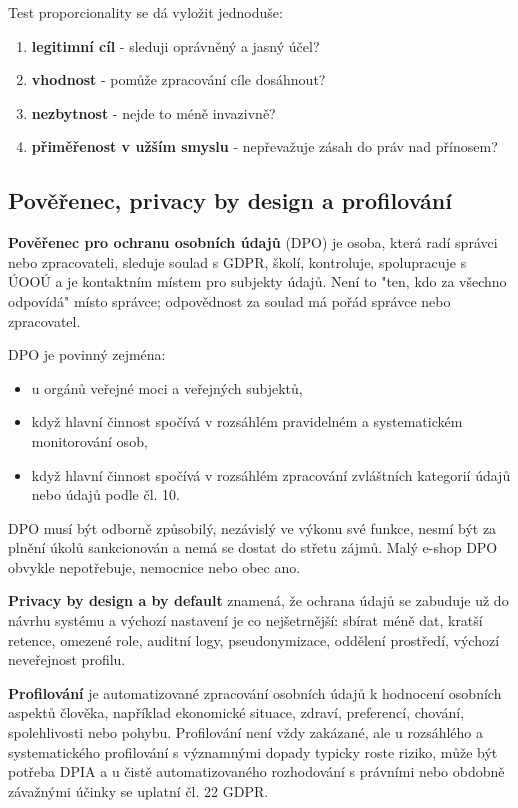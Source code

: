 Test proporcionality se dá vyložit jednoduše:
\begin{enumerate}
  \item \textbf{legitimní cíl} - sleduji oprávněný a jasný účel?
  \item \textbf{vhodnost} - pomůže zpracování cíle dosáhnout?
  \item \textbf{nezbytnost} - nejde to méně invazivně?
  \item \textbf{přiměřenost v užším smyslu} - nepřevažuje zásah do práv nad přínosem?
\end{enumerate}


\subsection*{Pověřenec, privacy by design a profilování}
\textbf{Pověřenec pro ochranu osobních údajů} (DPO) je osoba, která radí správci nebo zpracovateli, sleduje soulad s GDPR, školí, kontroluje, spolupracuje s ÚOOÚ a je kontaktním místem pro subjekty údajů. Není to "ten, kdo za všechno odpovídá" místo správce; odpovědnost za soulad má pořád správce nebo zpracovatel.

DPO je povinný zejména:
\begin{itemize}
  \item u orgánů veřejné moci a veřejných subjektů,
  \item když hlavní činnost spočívá v rozsáhlém pravidelném a systematickém monitorování osob,
  \item když hlavní činnost spočívá v rozsáhlém zpracování zvláštních kategorií údajů nebo údajů podle čl. 10.
\end{itemize}
DPO musí být odborně způsobilý, nezávislý ve výkonu své funkce, nesmí být za plnění úkolů sankcionován a nemá se dostat do střetu zájmů. Malý e-shop DPO obvykle nepotřebuje, nemocnice nebo obec ano.

\textbf{Privacy by design a by default} znamená, že ochrana údajů se zabuduje už do návrhu systému a výchozí nastavení je co nejšetrnější: sbírat méně dat, kratší retence, omezené role, auditní logy, pseudonymizace, oddělení prostředí, výchozí neveřejnost profilu.

\textbf{Profilování} je automatizované zpracování osobních údajů k hodnocení osobních aspektů člověka, například ekonomické situace, zdraví, preferencí, chování, spolehlivosti nebo pohybu. Profilování není vždy zakázané, ale u rozsáhlého a systematického profilování s významnými dopady typicky roste riziko, může být potřeba DPIA a u čistě automatizovaného rozhodování s právními nebo obdobně závažnými účinky se uplatní čl. 22 GDPR.

